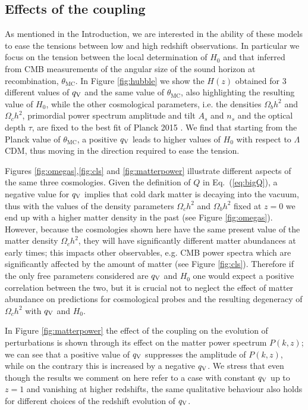 \documentclass[a4paper,fleqn,usenatbib]{mnras}
\begin{document}
\subsection{Effects of the coupling}
As mentioned in the Introduction, we are interested in the ability of these models to ease the tensions between low and high redshift observations. In particular we focus on the tension between the local determination of $H_0$ and that inferred from CMB measurements of the angular size of the sound horizon at recombination, $\theta_\mathrm{MC}$. In Figure \ref{fig:hubble} we show the $H(z)$ obtained for 3 different values of $q_{\rm V}$ and the same value of $\theta_\mathrm{MC}$, also highlighting the resulting value of $H_0$, while the other cosmological parameters, i.e. the densities $\Omega_bh^2$ and $\Omega_ch^2$, primordial power spectrum amplitude and tilt $A_s$ and $n_s$ and the optical depth $\tau$, are fixed to the best fit of Planck 2015 \cite{Ade:2015xua}. We find that starting from the Planck value of $\theta_\mathrm{MC}$, a positive $q_{\rm V}$ leads to higher values of $H_0$ with respect to $\Lambda$CDM, thus moving in the direction required to ease the tension.

Figures \ref{fig:omegas},\ref{fig:cls} and \ref{fig:matterpower} illustrate different aspects of the same three cosmologies. Given the definition of $Q$ in Eq.~(\ref{eq:bigQ}), a negative value for $q_{\rm V}$ implies that cold dark matter is decaying into the vacuum, thus with the values of the density parameters $\Omega_ch^2$ and $\Omega_bh^2$ fixed at $z=0$ we end up with a higher matter density in the past (see Figure \ref{fig:omegas}). However, because the cosmologies shown here have the same present value of the matter density $\Omega_ch^2$, they will have significantly different matter abundances at early times; this impacts other observables, e.g. CMB power spectra which are significantly affected by the amount of matter (see Figure \ref{fig:cls}). Therefore if the only free parameters considered  are $q_{\rm V}$ and $H_0$ one would expect a positive correlation between the two, but it is crucial not to neglect the effect of matter abundance on predictions for cosmological probes and the resulting degeneracy of $\Omega_ch^2$ with $q_{\rm V}$ and $H_0$.

In Figure \ref{fig:matterpower} the effect of the coupling on the evolution of perturbations is shown through its effect on the matter power spectrum $P(k,z)$; we can see that a positive value of $q_{\rm V}$ suppresses the amplitude of $P(k,z)$, while on the contrary this is increased by a negative $q_{\rm V}$. We stress that even though the results we comment on here refer to a case with constant $q_{\rm V}$ up to $z=1$ and vanishing at higher redshifts, the same qualitative behaviour also holds for different choices of the redshift evolution of $q_{\rm V}$.
\end{document}
